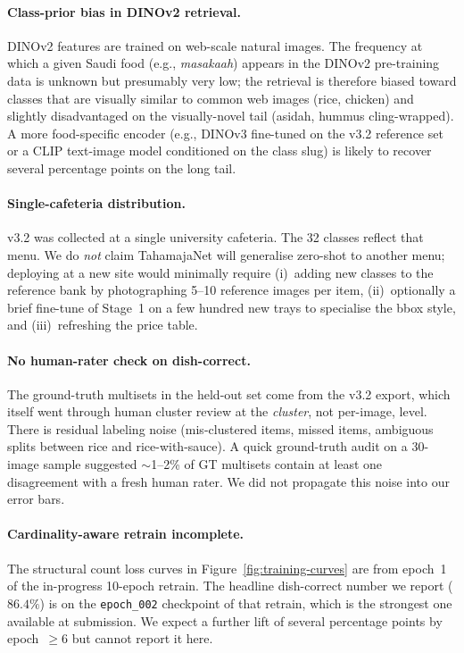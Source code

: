 \paragraph{Class-prior bias in DINOv2 retrieval.} DINOv2 features are
trained on web-scale natural images. The frequency at which a given Saudi
food (e.g., \textit{masakaah}) appears in the DINOv2 pre-training data is
unknown but presumably very low; the retrieval is therefore biased toward
classes that are visually similar to common web images (rice, chicken)
and slightly disadvantaged on the visually-novel tail (asidah, hummus
cling-wrapped). A more food-specific encoder (e.g., DINOv3 fine-tuned on
the v3.2 reference set or a CLIP text-image model conditioned on the
class slug) is likely to recover several percentage points on the long
tail.

\paragraph{Single-cafeteria distribution.} v3.2 was collected at a
single university cafeteria. The 32 classes reflect that menu. We do
\emph{not} claim TahamajaNet will generalise zero-shot to another menu;
deploying at a new site would minimally require (i)~adding new classes
to the reference bank by photographing 5–10 reference images per item,
(ii)~optionally a brief fine-tune of Stage~1 on a few hundred new trays
to specialise the bbox style, and (iii)~refreshing the price table.

\paragraph{No human-rater check on dish-correct.} The ground-truth
multisets in the held-out set come from the v3.2 export, which itself
went through human cluster review at the \emph{cluster}, not per-image,
level. There is residual labeling noise (mis-clustered items, missed
items, ambiguous splits between rice and rice-with-sauce). A quick
ground-truth audit on a 30-image sample suggested $\sim$1--2\% of GT
multisets contain at least one disagreement with a fresh human rater.
We did not propagate this noise into our error bars.

\paragraph{Cardinality-aware retrain incomplete.} The structural count
loss curves in Figure~\ref{fig:training-curves} are from epoch~1 of the
in-progress 10-epoch retrain. The headline dish-correct number we report
($86.4\%$) is on the \texttt{epoch\_002} checkpoint of that retrain,
which is the strongest one available at submission. We expect a further
lift of several percentage points by epoch~$\geq 6$ but cannot report
it here.

